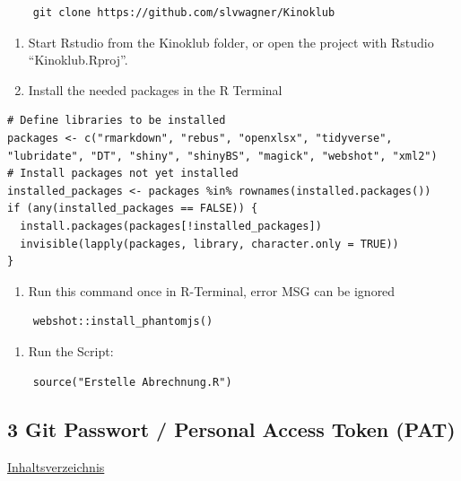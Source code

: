\documentclass[
]{article}
\providecommand{\tightlist}{%
  \setlength{\itemsep}{0pt}\setlength{\parskip}{0pt}}
\begin{document}
\begin{verbatim}
    git clone https://github.com/slvwagner/Kinoklub
\end{verbatim}

\begin{enumerate}
\def\labelenumi{\arabic{enumi}.}
\setcounter{enumi}{5}
\tightlist
\item
  Start Rstudio from the Kinoklub folder, or open the project with
  Rstudio ``Kinoklub.Rproj''.
\item
  Install the needed packages in the R Terminal
\end{enumerate}

\begin{verbatim}
# Define libraries to be installed
packages <- c("rmarkdown", "rebus", "openxlsx", "tidyverse", "lubridate", "DT", "shiny", "shinyBS", "magick", "webshot", "xml2")
# Install packages not yet installed
installed_packages <- packages %in% rownames(installed.packages())
if (any(installed_packages == FALSE)) {
  install.packages(packages[!installed_packages])
  invisible(lapply(packages, library, character.only = TRUE))
}
\end{verbatim}

\begin{enumerate}
\def\labelenumi{\arabic{enumi}.}
\setcounter{enumi}{6}
\tightlist
\item
  Run this command once in R-Terminal, error MSG can be ignored
\end{enumerate}

\begin{verbatim}
    webshot::install_phantomjs()
\end{verbatim}

\begin{enumerate}
\def\labelenumi{\arabic{enumi}.}
\setcounter{enumi}{7}
\tightlist
\item
  Run the Script:
\end{enumerate}

\begin{verbatim}
    source("Erstelle Abrechnung.R")
\end{verbatim}

\newpage

\subsection{3 Git Passwort / Personal Access Token
(PAT)}\label{git-passwort-personal-access-token-pat}

\hyperref[Inhaltsverzeichnis]{Inhaltsverzeichnis}
\end{document}
